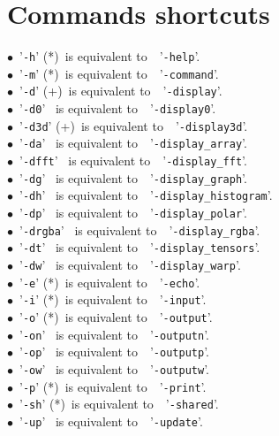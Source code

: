\documentclass[a4paper,11pt,twoside]{book}
\begin{document}
\section{Commands shortcuts}
$\bullet$~'\texttt{-h}' (*)~is equivalent to~~'\texttt{-help}'.\\
$\bullet$~'\texttt{-m}' (*)~is equivalent to~~'\texttt{-command}'.\\
$\bullet$~'\texttt{-d}' (+)~is equivalent to~~'\texttt{-display}'.\\
$\bullet$~'\texttt{-d0}' ~is equivalent to~~'\texttt{-display0}'.\\
$\bullet$~'\texttt{-d3d}' (+)~is equivalent to~~'\texttt{-display3d}'.\\
$\bullet$~'\texttt{-da}' ~is equivalent to~~'\texttt{-display\_array}'.\\
$\bullet$~'\texttt{-dfft}' ~is equivalent to~~'\texttt{-display\_fft}'.\\
$\bullet$~'\texttt{-dg}' ~is equivalent to~~'\texttt{-display\_graph}'.\\
$\bullet$~'\texttt{-dh}' ~is equivalent to~~'\texttt{-display\_histogram}'.\\
$\bullet$~'\texttt{-dp}' ~is equivalent to~~'\texttt{-display\_polar}'.\\
$\bullet$~'\texttt{-drgba}' ~is equivalent to~~'\texttt{-display\_rgba}'.\\
$\bullet$~'\texttt{-dt}' ~is equivalent to~~'\texttt{-display\_tensors}'.\\
$\bullet$~'\texttt{-dw}' ~is equivalent to~~'\texttt{-display\_warp}'.\\
$\bullet$~'\texttt{-e}' (*)~is equivalent to~~'\texttt{-echo}'.\\
$\bullet$~'\texttt{-i}' (*)~is equivalent to~~'\texttt{-input}'.\\
$\bullet$~'\texttt{-o}' (*)~is equivalent to~~'\texttt{-output}'.\\
$\bullet$~'\texttt{-on}' ~is equivalent to~~'\texttt{-outputn}'.\\
$\bullet$~'\texttt{-op}' ~is equivalent to~~'\texttt{-outputp}'.\\
$\bullet$~'\texttt{-ow}' ~is equivalent to~~'\texttt{-outputw}'.\\
$\bullet$~'\texttt{-p}' (*)~is equivalent to~~'\texttt{-print}'.\\
$\bullet$~'\texttt{-sh}' (*)~is equivalent to~~'\texttt{-shared}'.\\
$\bullet$~'\texttt{-up}' ~is equivalent to~~'\texttt{-update}'.\\
\end{document}
